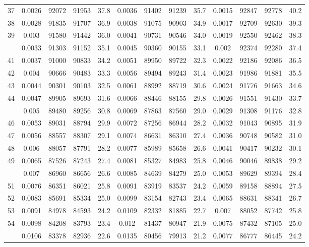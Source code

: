 \documentclass[
  14pt,
]{article}
\begin{document}
\begin{longtable}[t]{lcccccccccccc}
37 & 0.0026 & 92072 & 91953 & 37.8 & 0.0036 & 91402 & 91239 & 35.7 & 0.0015 & 92847 & 92778 & 40.2\\
38 & 0.0028 & 91835 & 91707 & 36.9 & 0.0038 & 91075 & 90903 & 34.9 & 0.0017 & 92709 & 92630 & 39.3\\
39 & 0.003 & 91580 & 91442 & 36.0 & 0.0041 & 90731 & 90546 & 34.0 & 0.0019 & 92550 & 92462 & 38.3\\
\addlinespace
40 & 0.0033 & 91303 & 91152 & 35.1 & 0.0045 & 90360 & 90155 & 33.1 & 0.002 & 92374 & 92280 & 37.4\\
41 & 0.0037 & 91000 & 90833 & 34.2 & 0.0051 & 89950 & 89722 & 32.3 & 0.0022 & 92186 & 92086 & 36.5\\
42 & 0.004 & 90666 & 90483 & 33.3 & 0.0056 & 89494 & 89243 & 31.4 & 0.0023 & 91986 & 91881 & 35.5\\
43 & 0.0044 & 90301 & 90103 & 32.5 & 0.0061 & 88992 & 88719 & 30.6 & 0.0024 & 91776 & 91663 & 34.6\\
44 & 0.0047 & 89905 & 89693 & 31.6 & 0.0066 & 88446 & 88155 & 29.8 & 0.0026 & 91551 & 91430 & 33.7\\
\addlinespace
45 & 0.005 & 89480 & 89256 & 30.8 & 0.0069 & 87863 & 87560 & 29.0 & 0.0029 & 91308 & 91176 & 32.8\\
46 & 0.0053 & 89031 & 88794 & 29.9 & 0.0072 & 87256 & 86944 & 28.2 & 0.0032 & 91043 & 90895 & 31.9\\
47 & 0.0056 & 88557 & 88307 & 29.1 & 0.0074 & 86631 & 86310 & 27.4 & 0.0036 & 90748 & 90582 & 31.0\\
48 & 0.006 & 88057 & 87791 & 28.2 & 0.0077 & 85989 & 85658 & 26.6 & 0.0041 & 90417 & 90232 & 30.1\\
49 & 0.0065 & 87526 & 87243 & 27.4 & 0.0081 & 85327 & 84983 & 25.8 & 0.0046 & 90046 & 89838 & 29.2\\
\addlinespace
50 & 0.007 & 86960 & 86656 & 26.6 & 0.0085 & 84639 & 84279 & 25.0 & 0.0053 & 89629 & 89394 & 28.4\\
51 & 0.0076 & 86351 & 86021 & 25.8 & 0.0091 & 83919 & 83537 & 24.2 & 0.0059 & 89158 & 88894 & 27.5\\
52 & 0.0083 & 85691 & 85334 & 25.0 & 0.0099 & 83154 & 82743 & 23.4 & 0.0065 & 88631 & 88341 & 26.7\\
53 & 0.0091 & 84978 & 84593 & 24.2 & 0.0109 & 82332 & 81885 & 22.7 & 0.007 & 88052 & 87742 & 25.8\\
54 & 0.0098 & 84208 & 83793 & 23.4 & 0.012 & 81437 & 80947 & 21.9 & 0.0075 & 87432 & 87105 & 25.0\\
\addlinespace
55 & 0.0106 & 83378 & 82936 & 22.6 & 0.0135 & 80456 & 79913 & 21.2 & 0.0077 & 86777 & 86445 & 24.2\\

\end{longtable}
\end{document}
